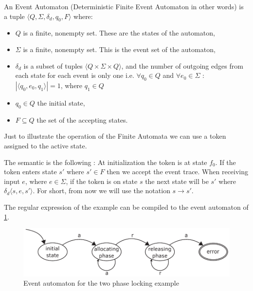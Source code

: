 				
				\begin{dfn}
					\label{dfn:cep:ea}
					An Event Automaton (Deterministic Finite Event Automaton in other words) is a tuple $\langle Q,\Sigma,\delta_d,q_0, F \rangle$  where: 
						\begin{itemize}
							\item $Q$ is a finite, nonempty set. These are the states of the automaton,
							\item $\Sigma$ is a finite, nonempty set. This is the event set of the automaton,
							\item $\delta_d$ is a subset of tuples $\langle Q \times \Sigma \times Q \rangle$,
								and the number of outgoing edges from each state for each event is only one 
								i.e. $\forall q_0 \in Q$ and $\forall e_0 \in \Sigma$ : $|\langle q_0, e_0, q_1 \rangle| = 1$, where $q_1 \in Q$ 
							\item $q_0 \in Q$ the initial state,
							\item $F \subseteq Q$ the set of the accepting states.
						\end{itemize}	
				\end{dfn}
				
				Just to illustrate the operation of the Finite Automata we can use a token assigned to the active state.

				The semantic is the following : 
				At initialization the token is at state $f_0$.
				If the token enters state $s'$ where $s' \in F$ then we accept the event trace. 
				When receiving input $e$, where $e \in \Sigma$, if the token is on state $s$ the next state will be $s'$ where %
				$\delta_d \langle s,e,s' \rangle$. For short, from now we will use the notation $s \rightarrow s'$. 
				
				The regular expression of the example can be compiled to the event automaton of \cref{fig:cep:fa}.
				
				\begin{figure}[h]
				\centering
				\includegraphics[width=0.7\linewidth]{include/figures/chapter_5/illustration_1}
				\caption{Event automaton for the two phase locking example}
				\label{fig:cep:fa}
				\end{figure}
				

